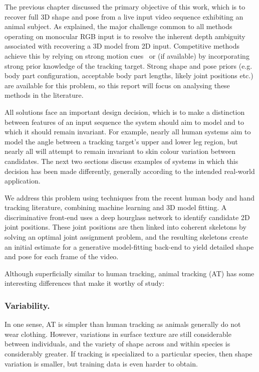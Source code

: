     The previous chapter discussed the primary objective of this work, which is to recover full 3D shape and pose from a live input video sequence exhibiting an animal subject. As explained, the major challenge common to all methods operating on monocular RGB input is to resolve the inherent depth ambiguity associated with recovering a 3D model from 2D input. Competitive methods achieve this by relying on strong motion cues~\cite{kinect_fusion} or (if available) by incorporating strong prior knowledge of the tracking target. Strong shape and pose priors (e.g. body part configuration, acceptable body part lengths, likely joint positions etc.) are available for this problem, so this report will focus on analysing these methods in the literature.

    All solutions face an important design decision, which is to make a distinction between features of an input sequence the system should aim to model and to which it should remain invariant. For example, nearly all human systems aim to model the angle between a tracking target's upper and lower leg region, but nearly all will attempt to remain invariant to skin colour variation between candidates. The next two sections discuss examples of systems in which this decision has been made differently, generally according to the intended real-world application.

    We address this problem using techniques from the recent human body and hand tracking literature, combining machine learning and 3D model fitting.  A discriminative front-end uses a deep hourglass network to identify candidate 2D joint positions. These joint positions are then linked into coherent skeletons by solving an optimal joint assignment problem, and the resulting skeletons create an initial estimate for a generative model-fitting back-end to yield detailed shape and pose for each frame of the video.  

    Although superficially similar to human tracking, animal tracking (AT) has some interesting differences that make it worthy of study:

    \subsubsection*{Variability.}
    In one sense, AT is simpler than human tracking as animals generally do not wear clothing. However, variations in surface texture are still considerable between individuals, and the variety of shape across and within species is considerably greater.  If tracking is specialized to a particular species, then shape variation is smaller, but training data is even harder to obtain.

